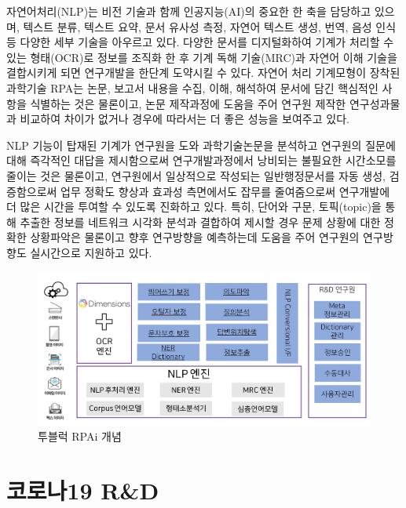 \documentclass[smallextended]{svjour3}       %
\begin{document}
자연어처리(NLP)는 비전 기술과 함께 인공지능(AI)의 중요한 한 축을
담당하고 있으며, 텍스트 분류, 텍스트 요약, 문서 유사성 측정, 자연어
텍스트 생성, 번역, 음성 인식 등 다양한 세부 기술을 아우르고 있다. 다양한
문서를 디지털화하여 기계가 처리할 수 있는 형태(OCR)로 정보를 조직화 한
후 기계 독해 기술(MRC)과 자연어 이해 기술을 결합시키게 되면 연구개발을
한단계 도약시킬 수 있다. 자연어 처리 기계모형이 장착된 과학기술 RPA는
논문, 보고서 내용을 수집, 이해, 해석하여 문서에 담긴 핵심적인 사항을
식별하는 것은 물론이고, 논문 제작과정에 도움을 주어 연구원 제작한
연구성과물과 비교하여 차이가 없거나 경우에 따라서는 더 좋은 성능을
보여주고 있다.

NLP 기능이 탑재된 기계가 연구원을 도와 과학기술논문을 분석하고 연구원의
질문에 대해 즉각적인 대답을 제시함으로써 연구개발과정에서 낭비되는
불필요한 시간소모를 줄이는 것은 물론이고, 연구원에서 일상적으로 작성되는
일반행정문서를 자동 생성, 검증함으로써 업무 정확도 향상과 효과성
측면에서도 잡무를 줄여줌으로써 연구개발에 더 많은 시간을 투여할 수
있도록 진화하고 있다. 특히, 단어와 구문, 토픽(topic)을 통해 추출한
정보를 네트워크 시각화 분석과 결합하여 제시할 경우 문제 상황에 대한
정확한 상황파악은 물론이고 향후 연구방향을 예측하는데 도움을 주어
연구원의 연구방향도 실시간으로 지원하고 있다.

\begin{figure}
\centering
\includegraphics{fig/nlp-rnd-engine.png}
\caption{투블럭 RPAi 개념}
\end{figure}

\hypertarget{covid-rnd}{%
\section{코로나19 R\&D}\label{covid-rnd}}
\end{document}
